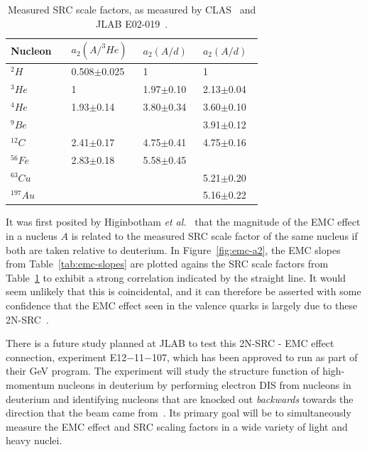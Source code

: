 \begin{table}
	\centering
	\setlength{\tabcolsep}{2em}
	\begin{tabular}{@{}lllll@{}}\toprule
		Nucleon & & $a_2(A/^3He)$~\cite{Egiyan:2005hs} & $a_2(A/d)$~\cite{PhysRevLett.106.052301} & $a_2(A/d)$~\cite{Fomin:2011ng} \\ \midrule    
		$^2H$ & &     0.508$\pm$0.025         & 1                                 &  1 \\
		$^3He$ & & 1                                  & 1.97$\pm$0.10        & 2.13$\pm$0.04 \\
		$^4He$ & & 1.93$\pm$0.14            & 3.80$\pm$0.34      &  3.60$\pm$0.10 \\
		$^9Be$ & &                                        &                               & 3.91$\pm$0.12 \\
		$^{12}C$ & & 2.41$\pm$0.17            & 4.75$\pm$0.41          & 4.75$\pm$0.16  \\
		$^{56}Fe$ & & 2.83$\pm$0.18           & 5.58$\pm$0.45        &  \\
		$^{63}Cu$ & &                                 &                                 & 5.21$\pm$0.20 \\
		$^{197}Au$ & &                                 &                                 & 5.16$\pm$0.22 \\ \bottomrule        
	\end{tabular}
	\caption{Measured SRC scale factors, as measured by CLAS~\cite{Egiyan:2005hs} and JLAB E02-019~\cite{PhysRevLett.106.052301, Fomin:2011ng}.}
	\label{tab:a2-src}
\end{table}

It was first posited by Higinbotham \emph{et al.}~\cite{Higinbotham:2010ye} that the magnitude of the EMC effect in a nucleus $A$ is related to the measured SRC scale factor of the same nucleus if both are taken relative to deuterium. In Figure~\ref{fig:emc-a2}, the EMC slopes from Table~\ref{tab:emc-slopes} are plotted agains the SRC scale factors from Table~\ref{tab:a2-src} to exhibit a strong correlation indicated by the straight line. It would seem unlikely that this is coincidental, and it can therefore be asserted with some confidence that the EMC effect seen in the valence quarks is largely due to these 2N-SRC~\cite{Rith:2014tma}.

There is a future study planned at JLAB to test this 2N-SRC - EMC effect connection, experiment E12−11−107, which has been approved to run as part of their \unit[12]{GeV} program. The experiment will study the structure function of high-momentum nucleons in deuterium by performing electron DIS from nucleons in deuterium and identifying nucleons that are knocked out \emph{backwards} towards the direction that the beam came from~\cite{Hen:2014vua}. Its primary goal will be to simultaneously measure the EMC effect and SRC scaling factors in a wide variety of light and heavy nuclei.

